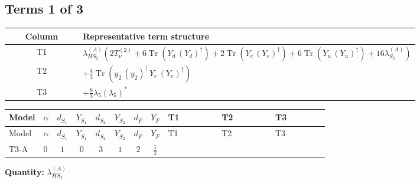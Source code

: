 \documentclass[8pt]{article}
\begin{document}
\begin{landscape}
\subsection*{Terms 1 of 3}
\begin{center}
\begin{tabular}{@{}c >{\raggedright\arraybackslash}p{0.82\linewidth}@{}}
\toprule
Column & Representative term structure \\
\midrule
T1 & \(\displaystyle {\lambda_{HS_2}^{(A)}} (2 T_{\nu}^{(2)}+6 \operatorname{Tr}\!\left({Y_d}\,\left({Y_d}\right)^{\dagger}\right)+2 \operatorname{Tr}\!\left({Y_e}\,\left({Y_e}\right)^{\dagger}\right)+6 \operatorname{Tr}\!\left({Y_u}\,\left({Y_u}\right)^{\dagger}\right)+16 {\lambda_{S_2}^{(A)}})\) \\
\midrule
T2 & \(\displaystyle +\frac{4}{3} \operatorname{Tr}\!\left({y_2}\,\left({y_2}\right)^{\dagger}\,{Y_e}\,\left({Y_e}\right)^{\dagger}\right)\) \\
\midrule
T3 & \(\displaystyle +\frac{8}{3} {\lambda_5} \left({\lambda_5}\right)^{*}\) \\
\midrule
\bottomrule
\end{tabular}
\end{center}
\smallskip
\tiny
\begin{longtable}{@{}llcccccc >{\raggedright\arraybackslash}p{0.21\linewidth} >{\raggedright\arraybackslash}p{0.21\linewidth} >{\raggedright\arraybackslash}p{0.21\linewidth}@{}}
\toprule
Model & $\alpha$ & $d_{S_1}$ & $Y_{S_1}$ & $d_{S_2}$ & $Y_{S_2}$ & $d_F$ & $Y_F$ & T1 & T2 & T3 \\
\midrule
\endfirsthead
\toprule
Model & $\alpha$ & $d_{S_1}$ & $Y_{S_1}$ & $d_{S_2}$ & $Y_{S_2}$ & $d_F$ & $Y_F$ & T1 & T2 & T3 \\
\midrule
\endhead
T3-A & $0$ & $1$ & $0$ & $3$ & $1$ & $2$ & $\frac{1}{2}$ & \scriptsize\adjustbox{max width=\linewidth}{$\begin{gathered} {\lambda_{HS_2}^{(A)}} (2 T_{\nu}^{(2)}+6 \operatorname{Tr}\!\left({Y_d}\,\left({Y_d}\right)^{\dagger}\right)+2 \operatorname{Tr}\!\left({Y_e}\,\left({Y_e}\right)^{\dagger}\right)+6 \operatorname{Tr}\!\left({Y_u}\,\left({Y_u}\right)^{\dagger}\right)+16 {\lambda_{S_2}^{(A)}})\end{gathered}$} & \scriptsize\adjustbox{max width=\linewidth}{$\begin{gathered} +\frac{4}{3} \operatorname{Tr}\!\left({y_2}\,\left({y_2}\right)^{\dagger}\,{Y_e}\,\left({Y_e}\right)^{\dagger}\right)\end{gathered}$} & \scriptsize\adjustbox{max width=\linewidth}{$\begin{gathered} +\frac{8}{3} {\lambda_5} \left({\lambda_5}\right)^{*}\end{gathered}$} \\
\midrule
\bottomrule
\end{longtable}
\clearpage
\noindent\textbf{Quantity: }$\lambda_{HS_2}^{(A)}$\par\smallskip

\end{landscape}
\end{document}

